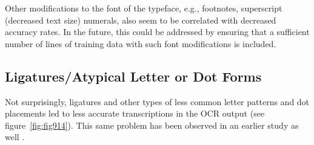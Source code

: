 Other modifications to the font of the typeface, e.g., footnotes, superscript
(decreased text size) numerals, also seem to be correlated with decreased
accuracy rates. In the future, this could be addressed by ensuring that a
sufficient number of lines of training data with such font modifications is
included.

\subsection{Ligatures/Atypical Letter or Dot Forms}

Not surprisingly, ligatures and other types of less common letter patterns and
dot placements led to less accurate transcriptions in the OCR output (see
figure~\ref{fig:fig914}). This same problem has been observed in an earlier study as well \cite{kiessling2017important}.

